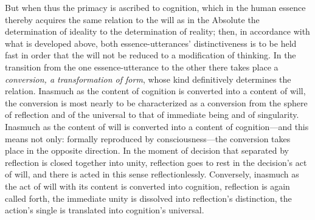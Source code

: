 \documentclass[12pt,a4paper]{book}
\begin{document}
But when thus the primacy is ascribed to cognition, which in the human essence thereby acquires
the same relation to the will as in the Absolute the determination of ideality to the determination
of reality; then, in accordance with what is developed above, both essence-utterances'
distinctiveness is to be held fast in order that the will not be reduced to a modification of
thinking. In the transition from the one essence-utterance to the other there takes place a
\emph{conversion, a transformation of form}, whose kind definitively determines the relation.
Inasmuch as the content of cognition is converted into a content of will, the conversion is most
nearly to be characterized as a conversion from the sphere of reflection and of the universal to
that of immediate being and of singularity. Inasmuch as the content of will is converted into a
content of cognition---and this means not only: formally reproduced by consciousness---the
conversion takes place in the opposite direction. In the moment of decision that separated by
reflection is closed together into unity, reflection goes to rest in the decision's act of will,
and there is acted in this sense reflectionlessly. Conversely, inasmuch as the act of will with its
content is converted into cognition, reflection is again called forth, the immediate unity is
dissolved into reflection's distinction, the action's single is translated into cognition's
universal.
\end{document}

